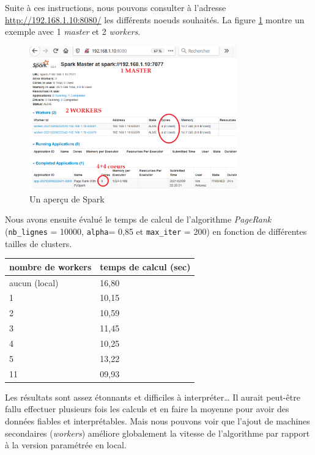 \documentclass[10pt,a4paper]{article}
\theoremstyle{break}
\begin{document}
Suite à ces instructions, nous pouvons consulter à l'adresse \url{http://192.168.1.10:8080/} les différents noeuds souhaités. La figure \ref{fig:fig3} montre un exemple avec 1 \emph{master} et 2 \emph{workers}.

\begin{figure}
\begin{center}
\includegraphics[width=0.8\textwidth]{img/spark.png}
\end{center}
\captionsetup{margin=0cm,format=hang,justification=justified}
\caption{Un aperçu de Spark}\label{fig:fig3}
\end{figure}

Nous avons ensuite évalué le temps de calcul de l'algorithme \emph{PageRank} (\texttt{nb\_lignes} = 10000, \texttt{alpha}= 0,85 et \texttt{max\_iter} = 200) en fonction de différentes tailles de clusters.

\begin{longtable}[]{@{}ll@{}}
\toprule
\textbf{nombre de workers} & \textbf{temps de calcul (sec)}\tabularnewline
\midrule
\endhead
aucun (local) & 16,80\tabularnewline
1 & 10,15\tabularnewline
2 & 10,59\tabularnewline
3 & 11,45\tabularnewline
4 & 10,25\tabularnewline
5 & 13,22\tabularnewline
11 & 09,93\tabularnewline
\bottomrule
\end{longtable}

Les résultats sont assez étonnants et difficiles à interpréter\ldots{} Il aurait peut-être fallu effectuer plusieurs fois les calculs et en faire la moyenne pour avoir des données fiables et interprétables. Mais nous pouvons voir que l'ajout de machines secondaires (\emph{workers}) améliore globalement la vitesse de l'algorithme par rapport à la version paramétrée en local.

\newpage
\end{document}
